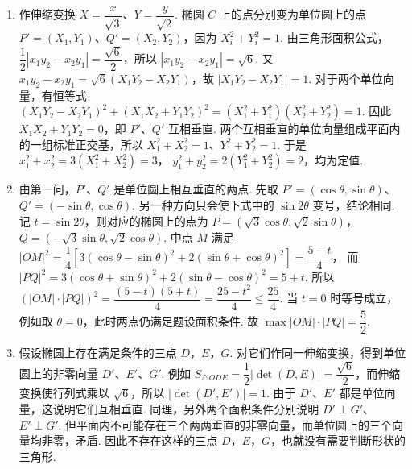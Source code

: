 \begin{solution}
\begin{enumerate}
\item 作伸缩变换
\(X=\dfrac{x}{\sqrt3}\)、\(Y=\dfrac{y}{\sqrt2}\). 椭圆 \(C\) 上的点分别变为单位圆上的点
\(P'=(X_1,Y_1)\)、\(Q'=(X_2,Y_2)\)，因为
\(X_i^2+Y_i^2=1\).
由三角形面积公式，
\(\dfrac12|x_1y_2-x_2y_1|=\dfrac{\sqrt6}{2}\)，所以
\(|x_1y_2-x_2y_1|=\sqrt6\). 又
\(x_1y_2-x_2y_1=\sqrt6(X_1Y_2-X_2Y_1)\)，故
\(|X_1Y_2-X_2Y_1|=1\).
对于两个单位向量，有恒等式
\((X_1Y_2-X_2Y_1)^2+(X_1X_2+Y_1Y_2)^2
=(X_1^2+Y_1^2)(X_2^2+Y_2^2)=1\).
因此 \(X_1X_2+Y_1Y_2=0\)，即 \(P'\)、\(Q'\) 互相垂直. 两个互相垂直的单位向量组成平面内的一组标准正交基，所以
\(X_1^2+X_2^2=1\)、\(Y_1^2+Y_2^2=1\). 于是
\(x_1^2+x_2^2=3(X_1^2+X_2^2)=3\)，
\(y_1^2+y_2^2=2(Y_1^2+Y_2^2)=2\)，均为定值.
\item 由第一问，\(P'\)、\(Q'\) 是单位圆上相互垂直的两点. 先取
\(P'=(\cos\theta,\sin\theta)\)、\(Q'=(-\sin\theta,\cos\theta)\). 另一种方向只会使下式中的 \(\sin2\theta\) 变号，结论相同. 记 \(t=\sin2\theta\)，则对应的椭圆上的点为
\(P=(\sqrt3\cos\theta,\sqrt2\sin\theta)\)，
\(Q=(-\sqrt3\sin\theta,\sqrt2\cos\theta)\).
中点 \(M\) 满足
\(|OM|^2=\dfrac14\left[3(\cos\theta-\sin\theta)^2+2(\sin\theta+\cos\theta)^2\right]=\dfrac{5-t}{4}\)，
而
\(|PQ|^2=3(\cos\theta+\sin\theta)^2+2(\sin\theta-\cos\theta)^2=5+t\).
所以
\((|OM|\cdot|PQ|)^2=\dfrac{(5-t)(5+t)}4=\dfrac{25-t^2}{4}\leqslant\dfrac{25}{4}\).
当 \(t=0\) 时等号成立，例如取 \(\theta=0\)，此时两点仍满足题设面积条件. 故
\(\max |OM|\cdot|PQ|=\dfrac52\).
\item 假设椭圆上存在满足条件的三点 \(D\)，\(E\)，\(G\). 对它们作同一伸缩变换，得到单位圆上的非零向量 \(D'\)、\(E'\)、\(G'\). 例如
\(S_{\triangle ODE}=\dfrac12|\det(D,E)|=\dfrac{\sqrt6}{2}\)，而伸缩变换使行列式乘以 \(\sqrt6\)，所以
\(|\det(D',E')|=1\). 由于 \(D'\)、\(E'\) 都是单位向量，这说明它们互相垂直. 同理，另外两个面积条件分别说明
\(D'\perp G'\)、\(E'\perp G'\).
但平面内不可能存在三个两两垂直的非零向量，而单位圆上的三个向量均非零，矛盾. 因此不存在这样的三点 \(D\)，\(E\)，\(G\)，也就没有需要判断形状的三角形.
\end{enumerate}
\end{solution}
